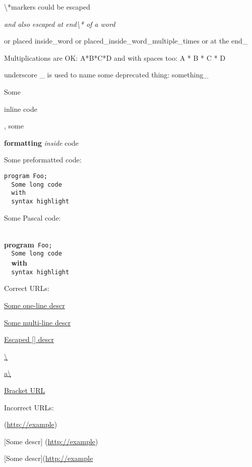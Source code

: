 \documentclass{report}
\begin{document}
{\textbackslash}*markers could be escaped

\textit{and also escaped at end{\textbackslash}* of a word}

or placed inside{\_}word or placed{\_}inside{\_}word{\_}multiple{\_}times or at the end{\_}

Multiplications are OK: A*B*C*D and with spaces too: A * B * C * D

underscore {\_} is used to name some deprecated thing: something{\_}

Some \begin{ttfamily}inline code\end{ttfamily}, some \begin{ttfamily}\textbf{formatting} \textit{inside} code\end{ttfamily}

Some preformatted code:

\begin{verbatim}
program Foo;
  Some long code
  with
  syntax highlight\end{verbatim}

Some Pascal code:

\texttt{\\\nopagebreak[3]
}\textbf{program}\texttt{~Foo;\\\nopagebreak[3]
~~Some~long~code\\\nopagebreak[3]
~~}\textbf{with}\texttt{\\\nopagebreak[3]
~~syntax~highlight\\
}

Correct URLs:

\href{http://example}{Some one-line descr}

\href{http://example}{Some multi-line
   descr}

\href{http://example}{Escaped [] descr}

\href{http://example}{{\textbackslash}}

\href{http://example}{a{\textbackslash}}

\href{http://example/(foo)}{Bracket URL}

Incorrect URLs:

(\href{http://example}{http://example})

[Some descr] (\href{http://example}{http://example})

[Some descr](\href{http://example}{http://example}
\end{document}
